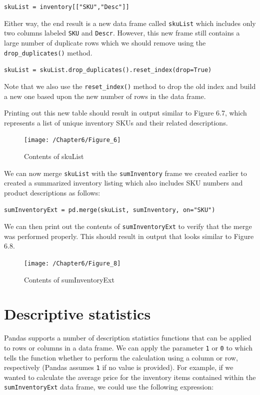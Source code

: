 \documentclass{book}
\begin{document}
\texttt{skuList = inventory[["SKU","Desc"]]}

Either way, the end result is a new data frame called \texttt{skuList} which includes only two columns labeled \texttt{SKU} and \texttt{Descr}. However, this new frame still contains a large number of duplicate rows which we should remove using the \texttt{drop\_duplicates()} method.

\texttt{skuList = skuList.drop\_duplicates().reset\_index(drop=True)}

Note that we also use the \texttt{reset\_index()} method to drop the old index and build a new one based upon the new number of rows in the data frame.

Printing out this new table should result in output similar to Figure 6.7, which represents a list of unique inventory SKUs and their related descriptions.

\begin{figure}[h]
	\caption{Contents of skuList}
	\centering\texttt{[image: /Chapter6/Figure\_6]}
\end{figure}

We can now merge \texttt{skuList} with the \texttt{sumInventory} frame we created earlier to created a summarized inventory listing which also includes SKU numbers and product descriptions as follows:

\texttt{sumInventoryExt = pd.merge(skuList, sumInventory, on="SKU")}

We can then print out the contents of \texttt{sumInventoryExt} to verify that the merge was performed properly. This should result in output that looks similar to Figure 6.8.

\begin{figure}[h]
	\caption{Contents of sumInventoryExt}
	\centering\texttt{[image: /Chapter6/Figure\_8]}
\end{figure}

\section{Descriptive statistics}

Pandas supports a number of description statistics functions that can be applied to rows or columns in a data frame. We can apply the parameter \texttt{1} or \texttt{0} to which tells the function whether to perform the calculation using a column or row, respectively (Pandas assumes \texttt{1} if no value is provided). For example, if we wanted to calculate the average price for the inventory items contained within the \texttt{sumInventoryExt} data frame, we could use the following expression:
\end{document}
